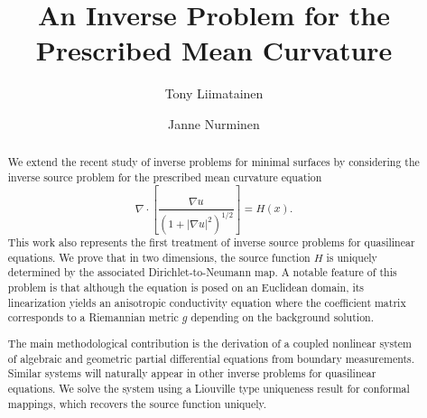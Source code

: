 \documentclass[a4paper, 10pt, twoside, notitlepage]{amsart}
\title[An Inverse Problem for the Prescribed Mean Curvature]{An Inverse  Problem for the Prescribed Mean Curvature}
\author[T. Liimatainen]{Tony Liimatainen}
\author[J. Nurminen]{Janne Nurminen}
\theoremstyle{plain}
\numberwithin{equation}{section}
\begin{document}
	\maketitle
	
	\begin{abstract}
We extend the recent study of inverse problems for minimal surfaces by considering the inverse source problem for the prescribed mean curvature equation
\begin{equation*}
    \nabla \cdot \left[ \frac{\nabla u}{(1 + |\nabla u|^2)^{1/2}} \right] = H(x).
\end{equation*}
This work also represents the first treatment of inverse source problems for quasilinear equations.
We prove that in two dimensions, the source function $H$ is uniquely determined by the associated Dirichlet-to-Neumann map. A notable feature of this problem is that although the equation is posed on an Euclidean domain, its linearization yields an anisotropic conductivity equation where the coefficient matrix corresponds to a Riemannian metric $g$ depending on the background solution. 

 The main methodological contribution is the derivation of a coupled nonlinear system of algebraic and geometric partial differential equations from boundary measurements. Similar systems will naturally appear in other inverse problems for quasilinear equations. We solve the system  using a Liouville type uniqueness result for conformal mappings, which recovers the source function uniquely. 








\end{abstract}
\end{document}
